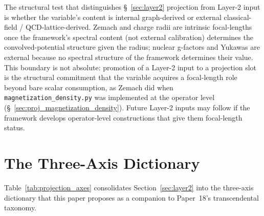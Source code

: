 \documentclass[11pt]{article}
\begin{document}
The structural test that distinguishes \S~\ref{sec:layer2}
projection from Layer-2 input is whether the variable's content is
internal graph-derived or external classical-field /
QCD-lattice-derived.  Zemach and charge radii are intrinsic
focal-lengths once the framework's spectral content (not external
calibration) determines the convolved-potential structure given the
radius; nuclear g-factors and Yukawas are external because no
spectral structure of the framework determines their value.  This
boundary is not absolute: promotion of a Layer-2 input to a
projection slot is the structural commitment that the variable
acquires a focal-length role beyond bare scalar consumption, as
Zemach did when \texttt{magnetization\_density.py} was implemented
at the operator level (\S~\ref{sec:proj_magnetization_density}).
Future Layer-2 inputs may follow if the framework develops
operator-level constructions that give them focal-length status.

\section{The Three-Axis Dictionary}
\label{sec:dictionary}

Table~\ref{tab:projection_axes} consolidates Section~\ref{sec:layer2}
into the three-axis dictionary that this paper proposes as a
companion to Paper~18's transcendental taxonomy.
\end{document}
